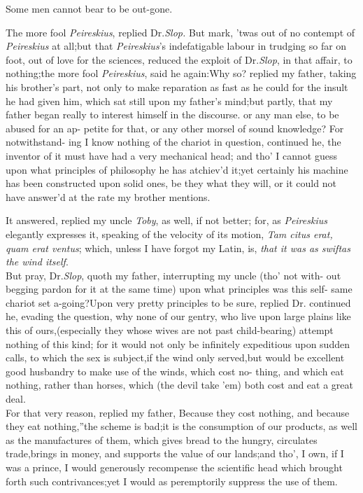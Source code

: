 \documentclass{article}
\begin{document}
Some men cannot bear to be out-gone.

The more fool \textit{Peireskius}, replied Dr.\@ \textit{Slop.} But
mark, ’twas out of no contempt of \textit{Peireskius} at
all;\tsh but that \textit{Peireskius}’s indefatigable labour in
trudging so far on foot, out of love for the sciences, reduced the
exploit of Dr.\@ \textit{Slop}, in that affair, to nothing;\tsk the
more fool \textit{Peireskius}, said he again:\tsk Why so?\tsk\break
replied my father, taking his brother’s part, not
only to make reparation as fast as he could for the insult he had
given him, which sat still upon my father’s\break
mind;\tsk but partly, that my father began really to
interest himself in the discourse.
or any man else, to be abused for an ap-
petite for that, or any other morsel of
sound knowledge? For notwithstand-\break
ing I know nothing of the chariot in\break
question, continued he, the inventor of it must have had a very mechanical head;\break
and tho’ I cannot guess upon what prin\-ciples of philosophy he has atchiev’d\break
it;\tsh yet certainly his machine has\break
been constructed upon solid ones, be\break
they what they will, or it could not\break
have answer’d at the rate my brother\break
mentions.

It answered, replied my uncle \textit{Toby}, as well, if not better; for, as \textit{Peireskius}
elegantly expresses it, speaking of the velocity of its motion,
\textit{Tam citus erat, quam erat ventus}; which, unless I have
forgot my Latin, is, \textit{that it was as swift\break as the wind
itself}.\\
\newpage
But pray, Dr.\@ \textit{Slop}, quoth my father,\break
interrupting my uncle (tho’ not with-\break
out begging pardon for it at the same
time) upon what principles was this self-\break
same chariot set a-going?\tsk Upon very pretty principles to be sure, replied
Dr.\break
{}\break
continued he, evading
the question, why none of our gentry, who live upon large plains
like this of ours,\tsk (especially they whose wives are not past
child-bearing) attempt nothing of this kind; for it would not only
be infinitely expeditious upon sudden calls, to which the sex is
subject,\tsk if the wind only served,\tsk but would be
excellent good husbandry to make use of the winds, which cost
no-\break
thing, and which eat nothing, rather\break
than horses, which (the devil take ’em)\break 
both cost and eat a great deal.\\
\newpage
For that very reason, replied my father,
\lqq Because they cost nothing, and\break
\lqq because they eat nothing,”\tsk the scheme\break
is bad;\tsk it is the
consumption of our products, as well as the manufactures of them,
which gives bread to the hungry, circulates trade,\tsk brings in
money, and supports the value of our lands;\tsk and tho’, I
own, if I was a prince, I would
ge\-nerously recompense the scientific head which brought
forth such contrivances;\break\tsk yet I
would as peremptorily suppress the use of them.
\end{document}

